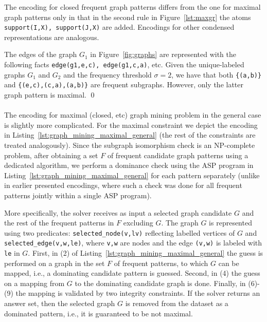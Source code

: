 {The encoding for closed frequent graph patterns differs from the one for maximal graph patterns only in that in the second rule in Figure~\ref{lst:maxgr} the atoms \texttt{support(I,X), support(J,X)} are added. Encodings for other condensed representations are analogous.

\begin{example}
The edges of the graph $G_1$ in Figure~\ref{fig:graphs} are represented with the following facts \texttt{edge(g1,e,c), edge(g1,c,a)}, etc. Given the unique-labeled graphs $G_1$ and $G_2$ and the frequency threshold $\sigma=2$, we have that both \texttt{\{(a,b)\}} and \texttt{\{(e,c),(c,a),(a,b)\}} are frequent subgraphs. However, only the latter graph pattern is maximal. \qed
\end{example}

\paragraph{} The encoding for maximal (closed, etc) graph mining problem in the general case is slightly more complicated. For the maximal constraint we depict the encoding in Listing~\ref{lst:graph_mining_maximal_general} (the rest of the constraints are treated analogously). Since the subgraph isomorphism check is an NP-complete problem, after obtaining a set $F$  of frequent candidate graph patterns using a dedicated algorithm, we perform a dominance check using the ASP program in Listing~\ref{lst:graph_mining_maximal_general} for each pattern separately (unlike in earlier presented encodings, where such a check was done for all frequent patterns jointly within a single ASP program). %

More specifically, the solver receives as input a selected graph candidate $G$ and the rest of the frequent patterns in $F$ excluding $G$. %
The graph $G$ is represented using two predicates: \texttt{selected\_node(v,lv)} reflecting labelled vertices of $G$ and \texttt{selected\_edge(v,w,le)}, where \texttt{v,w} are nodes and the edge \texttt{(v,w)} is labeled with \texttt{le} in $G$. First, in (2) of Listing~\ref{lst:graph_mining_maximal_general} the guess is performed on a graph in the set $F$ of frequent patterns, to which $G$ can be mapped, i.e., %
a dominating candidate pattern is guessed. Second, in (4) %
the guess on a mapping from %
$G$ to the dominating candidate graph %
is done. Finally, in (6)-(9) the mapping is validated by %
two integrity constraints. %
If %
the solver returns an answer set, then the selected graph $G$ is removed from the dataset as a dominated pattern, i.e., it is guaranteed to be not maximal.

}
